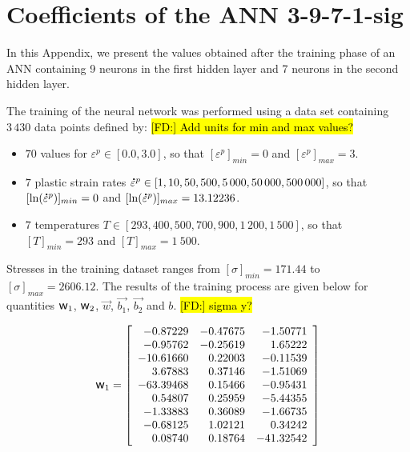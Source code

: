 \documentclass[preprint,12pt,times]{elsarticle}
\newcommand{\w}{\mbox{\large\ensuremath{\mathsf{w}}}}
\newcommand{\mdot}[1]{\accentset{\mbox{\bfseries .}}{#1}}
\DeclareRobustCommand{\FD}[1]{ {\begingroup\sethlcolor{VWgreen}\textcolor{black}{\hl{[FD:] #1}}\endgroup} }
\begin{document}
\section{Coefficients of the ANN 3-9-7-1-sig\label{sec:appendix-1}}

In this Appendix, we present the values obtained after the training phase of an ANN containing 9 neurons in the first hidden layer and 7 neurons in the second hidden layer.

The training of the neural network was performed using a data set containing $3\,430$ data points defined by: \FD{Add units for min and max values?}
\begin{itemize}
\item $70$ values for $\varepsilon^p\in[0.0,3.0]$, so that $[\varepsilon^p]_{min}=0$ and $[\varepsilon^p]_{max}=3$.
\item $7$ plastic strain rates $\mdot{\varepsilon}^p\in[1, 10, 50, 500, 5\,000, 50\,000, 500\,000]$, so that $[\ln(\mdot{\varepsilon}^p)]_{min}=0$ and $[\ln(\mdot{\varepsilon}^p)]_{max}=13.12236$.
\item  $7$ temperatures $T\in[293, 400, 500, 700, 900, 1\,200, 1\,500]$, so that $[T]_{min}=293$ and $[T]_{max}=1\ 500$.
\end{itemize}

Stresses in the training dataset ranges from $[\sigma]_{min}=171.44$ to $[\sigma]_{max}=2606.12$.
The results of the training process are given below for quantities $\w_1$, $\w_2$, $\overrightarrow{w}$, $\overrightarrow{b_1}$, $\overrightarrow{b_2}$ and $b$.\FD{sigma y?}

\begin{equation*}
\w_1=\left[
\begin{array}{rrr}
 -0.87229 & -0.47675 & -1.50771\\
 -0.95762 & -0.25619 &  1.65222\\
 -10.61660 &  0.22003 & -0.11539\\
  3.67883 &  0.37146 & -1.51069\\
 -63.39468 &  0.15466 & -0.95431\\
  0.54807 &  0.25959 & -5.44355\\
 -1.33883 &  0.36089 & -1.66735\\
 -0.68125 &  1.02121 &  0.34242\\
  0.08740 &  0.18764 & -41.32542
\end{array}\right]
\end{equation*}
\end{document}
